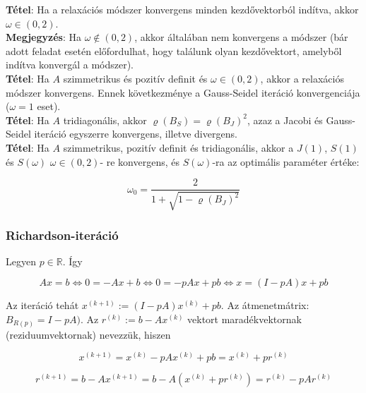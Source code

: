 \documentclass[margin=0px]{article}
\begin{document}
	\noindent \textbf{Tétel}: Ha a relaxációs módszer konvergens minden kezdővektorból indítva, akkor $\omega \in (0,2)$.\\
	
	\noindent \textbf{Megjegyzés}: Ha $\omega \notin (0,2)$, akkor általában nem konvergens a módszer (bár adott feladat esetén előfordulhat,
	hogy találunk olyan kezdővektort, amelyből indítva konvergál a módszer).\\
	
	\noindent \textbf{Tétel}: Ha $A$ szimmetrikus és pozitív definit és $\omega \in (0, 2)$, akkor a relaxációs módszer konvergens. Ennek
	következménye a Gauss-Seidel iteráció konvergenciája ($\omega = 1$ eset).\\
	
	\noindent \textbf{Tétel}: Ha $A$ tridiagonális, akkor $\varrho(B_{S}) = \varrho(B_{J})^{2}$, azaz a Jacobi és Gauss-Seidel iteráció
	egyszerre konvergens, illetve divergens.\\
	
	\noindent \textbf{Tétel}: Ha $A$ szimmetrikus, pozitív definit és tridiagonális, akkor a $J(1)$, $S(1)$ és $S(\omega)$ $\omega \in (0, 2)$-
	re konvergens, és $S(\omega)$-ra az optimális paraméter értéke:
	
	\begin{displaymath}
		\omega_{0} = \frac{2}{1 + \sqrt{1 - \varrho(B_{J})^{2}}}
	\end{displaymath}
	
	\subsubsection{Richardson-iteráció}
	
	Legyen $p \in \mathbb{R}$. Így
	
	\begin{displaymath}
		Ax = b \Longleftrightarrow
		0 = -Ax + b \Longleftrightarrow
		0 = -pAx + pb \Longleftrightarrow
		x = (I-pA)x +pb
	\end{displaymath}
	
	Az iteráció tehát $x^{(k+1)} := (I-pA)x^{(k)} +pb$. Az átmenetmátrix: $B_{R(p)} = I-pA)$. Az
	$r^{(k)} := b - Ax^{(k)} $ vektort maradékvektornak (reziduumvektornak) nevezzük, hiszen
	
	\begin{displaymath}
		x^{(k+1)} = x^{(k)} - pAx^{(k)} + pb = x^{(k)} + pr^{(k)}
	\end{displaymath}
	
	\begin{displaymath}
		r^{(k+1)} = b - Ax^{(k+1)} = b - A(x^{(k)} + pr^{(k)}) = r^{(k)} - pAr^{(k)}
	\end{displaymath}
	
\end{document}
